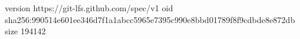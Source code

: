 version https://git-lfs.github.com/spec/v1
oid sha256:990514e601ee346d7f1a1abcc5965e7395c990e8bbd01789f8f9cdbde8e872db
size 194142
